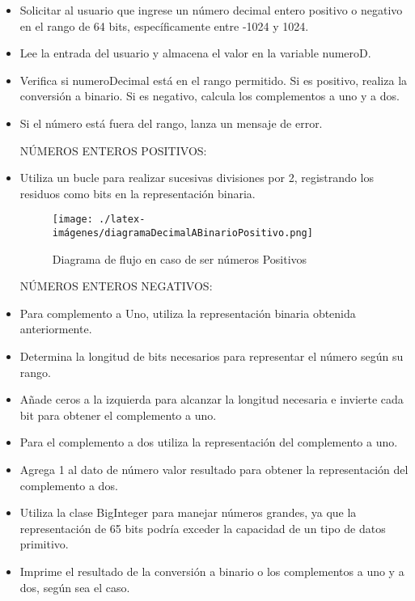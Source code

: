 \begin{itemize}
    \item Solicitar al usuario que ingrese un número decimal entero positivo o negativo en el rango de 64 bits, específicamente entre -1024 y 1024.
    \item Lee la entrada del usuario y almacena el valor en la variable numeroD.
    \item Verifica si numeroDecimal está en el rango permitido. Si es positivo, realiza la conversión a binario. Si es negativo, calcula los complementos a uno y a dos.
    \item Si el número está fuera del rango, lanza un mensaje de error.
    \newline 
    
    \newline NÚMEROS ENTEROS POSITIVOS:
    \item Utiliza un bucle para realizar sucesivas divisiones por 2, registrando los residuos como bits en la representación binaria.

    
    \begin{figure}
        \centerline{\texttt{[image: ./latex-imágenes/diagramaDecimalABinarioPositivo.png]}}
        \caption{Diagrama de flujo en caso de ser números Positivos}
        \vspace*{-5pt}
        \label{fig:dos}
        \end{figure}


    \newline NÚMEROS ENTEROS NEGATIVOS:
    \item Para complemento a Uno, utiliza la representación binaria obtenida anteriormente.
    \item Determina la longitud de bits necesarios para representar el número según su rango.
    \item Añade ceros a la izquierda para alcanzar la longitud necesaria e invierte cada bit para obtener el complemento a uno.
    \newline 
    
    \item Para el complemento a dos utiliza la representación del complemento a uno.
    \item Agrega 1 al dato de número valor resultado para obtener la representación del complemento a dos.
    \item Utiliza la clase BigInteger para manejar números grandes, ya que la representación de 65 bits podría exceder la capacidad de un tipo de datos primitivo.
    \item Imprime el resultado de la conversión a binario o los complementos a uno y a dos, según sea el caso.
    \end{itemize}

